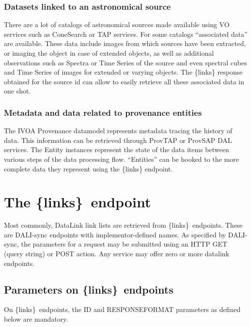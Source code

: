 \documentclass[11pt,a4paper]{ivoa}
\newcommand{\blinks}{\{links\}}
\begin{document}
\subsubsection{Datasets linked to an astronomical source}

There are  a lot of catalogs of astronomical sources made available
using VO services such as ConeSearch \citep{2008ivoa.specQ0222P} or TAP
services. For some catalogs ``associated data'' are available. These
data include images from which sources have been extracted, or imaging the
object in  case of extended objects, as well as additional observations
such as Spectra or Time Series of the source and even spectral cubes
and Time Series of images for extended or varying objects. The {\blinks}
response obtained for the source id can allow to easily retrieve all
these associated data in one shot.

\subsubsection{Metadata and data related to provenance entities}

The IVOA Provenance datamodel \citep{pr:provdm} represents metadata
tracing  the history of data. This information can be retrieved through
ProvTAP \citep{iwd:provtap} or ProvSAP \citep{iwd:provsap}  DAL services.
The Entity instances represent  the state of the data items between
various steps of the data processing flow. ``Entities'' can be hooked
to the more complete data they represent using the {\blinks} endpoint.

\section{The \blinks~endpoint}

\label{sec:linksEndpoint}

Most commonly, DataLink link lists are retrieved from \blinks~endpoints.
These are DALI-sync endpoints with implementor-defined names.
As specified by DALI-sync, the parameters for a request may be submitted
using an HTTP GET (query string) or POST action.  Any service may offer
zero or more datalink endpoints.

\subsection{Parameters on \blinks~endpoints}

On \blinks~endpoints, the ID and RESPONSEFORMAT parameters as defined
below are mandatory.
\end{document}
